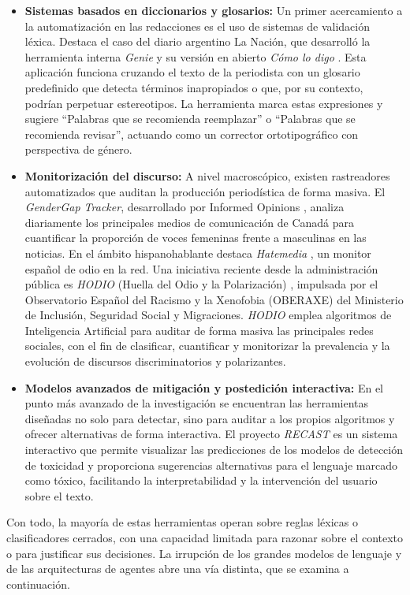 \begin{itemize}
    \item \textbf{Sistemas basados en diccionarios y glosarios:} Un primer acercamiento a la automatización en las redacciones es el uso de sistemas de validación léxica. Destaca el caso del diario argentino La Nación, que desarrolló la herramienta interna \textit{Genie} y su versión en abierto \textit{Cómo lo digo} \cite{lanacion2024}. Esta aplicación funciona cruzando el texto de la periodista con un glosario predefinido que detecta términos inapropiados o que, por su contexto, podrían perpetuar estereotipos. La herramienta marca estas expresiones y sugiere ``Palabras que se recomienda reemplazar'' o ``Palabras que se recomienda revisar'', actuando como un corrector ortotipográfico con perspectiva de género.

    \item \textbf{Monitorización del discurso:} A nivel macroscópico, existen rastreadores automatizados que auditan la producción periodística de forma masiva. El \textit{GenderGap Tracker}, desarrollado por Informed Opinions \cite{gendergap2018}, analiza diariamente los principales medios de comunicación de Canadá para cuantificar la proporción de voces femeninas frente a masculinas en las noticias. En el ámbito hispanohablante destaca \textit{Hatemedia} \cite{hatemedia2023}, un monitor español de odio en la red. Una iniciativa reciente desde la administración pública es \textit{HODIO} (Huella del Odio y la Polarización) \cite{hodio2026}, impulsada por el Observatorio Español del Racismo y la Xenofobia (OBERAXE) del Ministerio de Inclusión, Seguridad Social y Migraciones. \textit{HODIO} emplea algoritmos de Inteligencia Artificial para auditar de forma masiva las principales redes sociales, con el fin de clasificar, cuantificar y monitorizar la prevalencia y la evolución de discursos discriminatorios y polarizantes.

    \item \textbf{Modelos avanzados de mitigación y postedición interactiva:} En el punto más avanzado de la investigación se encuentran las herramientas diseñadas no solo para detectar, sino para auditar a los propios algoritmos y ofrecer alternativas de forma interactiva. El proyecto \textit{RECAST} \cite{wright2021} es un sistema interactivo que permite visualizar las predicciones de los modelos de detección de toxicidad y proporciona sugerencias alternativas para el lenguaje marcado como tóxico, facilitando la interpretabilidad y la intervención del usuario sobre el texto.
\end{itemize}

Con todo, la mayoría de estas herramientas operan sobre reglas léxicas o clasificadores cerrados, con una capacidad limitada para razonar sobre el contexto o para justificar sus decisiones. La irrupción de los grandes modelos de lenguaje y de las arquitecturas de agentes abre una vía distinta, que se examina a continuación.